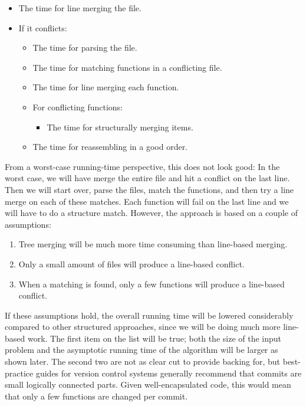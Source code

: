\documentclass[11pt]{article}
\begin{document}
\begin{itemize}
\item The time for line merging the file.
\item If it conflicts:
\begin{itemize}
\item The time for parsing the file.
\item The time for matching functions in a conflicting file.
\item The time for line merging each function.
\item For conflicting functions:
\begin{itemize}
\item The time for structurally merging items.
\end{itemize}
\item The time for reassembling in a good order.
\end{itemize}
\end{itemize}

From a worst-case running-time perspective, this does not look good: In the worst case, we will have merge the entire file and hit a conflict on the last line. Then we will start over, parse the files, match the functions, and then try a line merge on each of these matches. Each function will fail on the last line and we will have to do a structure match. However, the approach is based on a couple of assumptions:

\begin{enumerate}
	\item Tree merging will be much more time consuming than line-based merging.
	\item Only a small amount of files will produce a line-based conflict.
	\item When a matching is found, only a few functions will produce a line-based conflict.
\end{enumerate}

If these assumptions hold, the overall running time will be lowered considerably compared to other structured approaches, since we will be doing much more line-based work. The first item on the list will be true; both the size of the input problem and the asymptotic running time of the algorithm will be larger as shown later. The second two are not as clear cut to provide backing for, but best-practice guides for version control systems generally recommend that commits are small logically connected parts. Given well-encapsulated code, this would mean that only a few functions are changed per commit.
\end{document}

